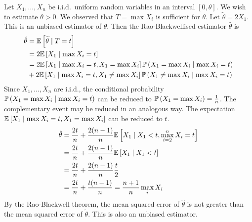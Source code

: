 \begin{example}
	Let \( X_1, \dots, X_n \) be i.i.d.\ uniform random variables in an interval \( [0, \theta] \).
	We wish to estimate \( \theta > 0 \).
	We observed that \( T = \max X_i \) is sufficient for \( \theta \).
	Let \( \widetilde \theta = 2 X_1 \).
	This is an unbiased estimator of \( \theta \).
	Then the Rao-Blackwellised estimator \( \hat \theta \) is
	\begin{align*}
		\hat \theta &= \mathbb{E}\left[{\widetilde \theta \mid T = t}\right] \\
		&= 2 \mathbb{E}\left[{X_1 \mid \max X_i = t}\right] \\
		&= 2 \mathbb{E}\left[{X_1 \mid \max X_i = t, X_1 = \max X_i}\right] \mathbb{P}\left({X_1 = \max X_i \mid \max X_i = t}\right) \\
		&+ 2 \mathbb{E}\left[{X_1 \mid \max X_i = t, X_1 \neq \max X_i}\right] \mathbb{P}\left({X_1 \neq \max X_i \mid \max X_i = t}\right) \\
	\end{align*}
	Since \( X_1, \dots, X_n \) are i.i.d., the conditional probability \( \mathbb{P}\left({X_1 = \max X_i \mid \max X_i = t}\right) \) can be reduced to \( \mathbb{P}\left({X_1 = \max X_i}\right) = \frac{1}{n} \).
	The complementary event may be reduced in an analogous way.
	The expectation \( \mathbb{E}\left[{X_1 \mid \max X_i = t, X_1 = \max X_i}\right] \) can be reduced to \( t \).
	\begin{align*}
		\hat \theta &= \frac{2t}{n} + \frac{2(n-1)}{n} \mathbb{E}\left[{X_1 \mid X_1 < t, \max_{i=2}^n X_i = t}\right] \\
		&= \frac{2t}{n} + \frac{2(n-1)}{n} \mathbb{E}\left[{X_1 \mid X_1 < t}\right] \\
		&= \frac{2t}{n} + \frac{2(n-1)}{n} \frac{t}{2} \\
		&= \frac{2t}{n} + \frac{t(n-1)}{n} = \frac{n+1}{n} \max_i X_i
	\end{align*}
	By the Rao-Blackwell theorem, the mean squared error of \( \hat \theta \) is not greater than the mean squared error of \( \widetilde \theta \).
	This is also an unbiased estimator.
\end{example}

